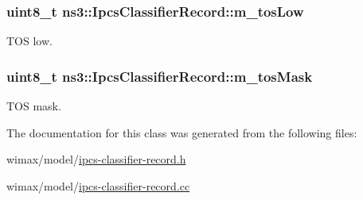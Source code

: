 \subsubsection[{\texorpdfstring{m\+\_\+tos\+Low}{m_tosLow}}]{\setlength{\rightskip}{0pt plus 5cm}uint8\+\_\+t ns3\+::\+Ipcs\+Classifier\+Record\+::m\+\_\+tos\+Low\hspace{0.3cm}{\ttfamily [private]}}\hypertarget{classns3_1_1IpcsClassifierRecord_a2bf94f3ee75c2ea466fc1ba40d3da488}{}\label{classns3_1_1IpcsClassifierRecord_a2bf94f3ee75c2ea466fc1ba40d3da488}


T\+OS low. 

\subsubsection[{\texorpdfstring{m\+\_\+tos\+Mask}{m_tosMask}}]{\setlength{\rightskip}{0pt plus 5cm}uint8\+\_\+t ns3\+::\+Ipcs\+Classifier\+Record\+::m\+\_\+tos\+Mask\hspace{0.3cm}{\ttfamily [private]}}\hypertarget{classns3_1_1IpcsClassifierRecord_a51cec1405f4bac281234a0e4b2c9a683}{}\label{classns3_1_1IpcsClassifierRecord_a51cec1405f4bac281234a0e4b2c9a683}


T\+OS mask. 



The documentation for this class was generated from the following files\+:\begin{DoxyCompactItemize}
\item 
wimax/model/\hyperlink{ipcs-classifier-record_8h}{ipcs-\/classifier-\/record.\+h}\item 
wimax/model/\hyperlink{ipcs-classifier-record_8cc}{ipcs-\/classifier-\/record.\+cc}\end{DoxyCompactItemize}
